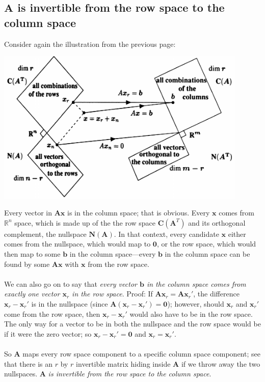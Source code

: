 \documentclass{report}
\begin{document}
\subsection{$\bm A$ is invertible from the row space to the column space}
Consider again the illustration from the previous page:
\begin{center}
\includegraphics[width=12cm]{53}
\end{center}
Every vector in $\bm{Ax}$ is in the column space; that is obvious. Every $\bm x$ comes from $\mathbb{R}^n$ space, which is made up of the the row space $\bm C(\bm A^T)$ and
its orthogonal complement, the nullspace $\bm N(\bm A)$. In that context, every candidate $\bm x$ either comes from the nullspace, which would map to $\bm0$, or
the row space, which would then map to some $\bm b$ in the column space---every $\bm b$ in the column space can be found by some $\bm{Ax}$ with $\bm x$ from the 
row space.\\
\vspace{1mm}\\
We can also go on to say that \textit{every vector $\bm b$ in the column space comes from exactly one vector $\bm x_r$ in the row space}. Proof: If $\bm{Ax}_r=\bm{Ax}_{r}'$,
the difference $\bm{x}_r-\bm{x}_{r}'$ is in the nullspace (since 
$\bm A(\bm{x}_r-\bm{x}_{r}')=\bm 0$); however, should $\bm{x}_r$ and $\bm{x}_{r}'$ come from the row space, then $\bm{x}_r-\bm{x}_{r}'$ would also have to be in the row
space. The only way for a vector to be in both the nullspace and the row space would be if it were the zero vector; so $\bm{x}_r-\bm{x}_{r}'=\bm 0$ and 
$\bm{x}_r=\bm{x}_{r}'$.\\
\vspace{1mm}\\
So $\bm A$ maps every row space component to a specific column space component; see that there is an $r$ by $r$ invertible matrix hiding inside $\bm A$ if we throw away the 
two nullspaces. $\bm A$ \textit{is invertible from the row space to the column space}.
\newpage
\end{document}
